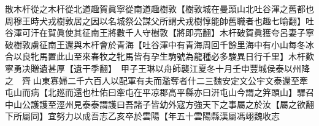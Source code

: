散木杆從之木杆從北道趣賀眞寧從南道趣樹敦【樹敦城在曼頭山北吐谷渾之舊都也周穆王時犬戎樹敦居之因以名城祭公謀父所謂犬戎樹惇能帥舊職者也趣七喻翻】吐谷渾可汗在賀眞使其征南王將數千人守樹敦【將即亮翻】木杆破賀眞獲夸呂妻子寧破樹敦虜征南王還與木杆會於青海【吐谷渾中有青海周回千餘里海中有小山每冬冰合以良牝馬置此山至來春牧之牝馬皆有孕生駒號為龍種必多駿異日行千里】木杆歎寧勇决贈遺甚厚【遺干季翻】　甲子王琳以舟師襲江夏冬十月壬申豐城侯泰以州降之　齊山東寡婦二千六百人以配軍有夫而濫奪者什二三魏安定文公宇文泰還至牽屯山而病【北廵而還也杜佑曰牽屯在平凉郡高平縣亦曰汧屯山今謂之笄頭山】驛召中山公護護至涇州見泰泰謂護曰吾諸子皆幼外寇方強天下之事屬之於汝【屬之欲翻下所屬同】宜努力以成吾志乙亥卒於雲陽【年五十雲陽縣漢屬馮翊魏收志